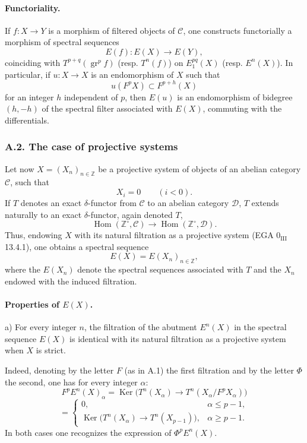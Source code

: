 \documentclass[11pt]{article}
\DeclareMathOperator{\Hom}{Hom}
\providecommand{\Ker}{\operatorname{Ker}}
\providecommand{\gr}{\operatorname{gr}}
\providecommand{\Hom}{\operatorname{Hom}}
\providecommand{\Ker}{\operatorname{Ker}}
\providecommand{\gr}{\operatorname{gr}}
\providecommand{\gr}{\operatorname{gr}}
\providecommand{\Ker}{\operatorname{Ker}}
\providecommand{\Hom}{\operatorname{Hom}}
\begin{document}
\paragraph{Functoriality.}
If \(f:X\to Y\) is a morphism of filtered objects of \(\mathcal C\), one constructs functorially a morphism of spectral sequences
\[
E(f):E(X)\longrightarrow E(Y),
\]
coinciding with \(T^{p+q}(\gr^p f)\) (resp. \(T^n(f)\)) on \(E_1^{pq}(X)\) (resp. \(E^n(X)\)). In particular, if \(u:X\to X\) is an endomorphism of \(X\) such that
\[
u(F^pX)\subset F^{p+h}(X)
\]
for an integer \(h\) independent of \(p\), then \(E(u)\) is an endomorphism of bidegree \((h,-h)\) of the spectral filter associated with \(E(X)\), commuting with the differentials.

\subsubsection*{A.2. The case of projective systems}\label{sga5:V:subsubsection:a.2}
Let now \(X=(X_n)_{n\in\mathbb Z}\) be a projective system of objects of an abelian category \(\mathcal C\), such that
\[
X_i=0\qquad(i<0).
\]
If \(T\) denotes an exact \(\delta\)-functor from \(\mathcal C\) to an abelian category \(\mathcal D\), \(T\) extends naturally to an exact \(\delta\)-functor, again denoted \(T\),
\[
\Hom(\mathbb Z^\circ,\mathcal C)\longrightarrow \Hom(\mathbb Z^\circ,\mathcal D).
\]
Thus, endowing \(X\) with its natural filtration as a projective system (EGA \(0_{\mathrm{III}}\) 13.4.1), one obtains a spectral sequence
\[
E(X)=E(X_n)_{n\in\mathbb Z},
\]
where the \(E(X_n)\) denote the spectral sequences associated with \(T\) and the \(X_n\) endowed with the induced filtration.

\paragraph{Properties of \(E(X)\).}
a) For every integer \(n\), the filtration of the abutment \(E^n(X)\) in the spectral sequence \(E(X)\) is identical with its natural filtration as a projective system when \(X\) is strict.

Indeed, denoting by the letter \(F\) (as in A.1) the first filtration and by the letter \(\Phi\) the second, one has for every integer \(\alpha\):
\[
F^pE^n(X)_\alpha
=\Ker\bigl(T^n(X_\alpha)\longrightarrow T^n(X_\alpha/F^pX_\alpha)\bigr)
\]
\[
=
\begin{cases}
0,& \alpha\le p-1,\\
\Ker\bigl(T^n(X_\alpha)\longrightarrow T^n(X_{p-1})\bigr),& \alpha\ge p-1.
\end{cases}
\]
In both cases one recognizes the expression of \(\Phi^pE^n(X)\).
\end{document}
